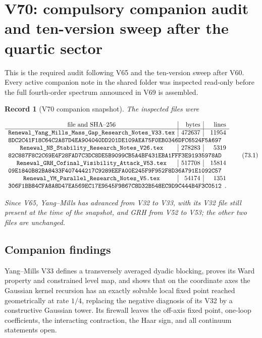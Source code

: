 \documentclass[11pt]{article}
\newtheorem{record}[theorem]{Record}
\theoremstyle{remark}
\begin{document}
\section{V70: compulsory companion audit and ten-version sweep after the quartic sector}
\label{sec:v19v70}

This is the required audit following V65 and the ten-version sweep
after V60.  Every active companion note in the shared folder was
inspected read-only before the full fourth-order spectrum announced in
V69 is assembled.

\begin{record}[V70 companion snapshot]
\label{rec:v19v70-snapshot}
The inspected files were

\[
\begin{array}{c|r|r}
\hbox{file and SHA--256}&\hbox{bytes}&\hbox{lines}\\ \hline
\texttt{Renewal\_Yang\_Mills\_Mass\_Gap\_Research\_Notes\_V33.tex}
&472637&11954\\
\multicolumn{3}{l}{
\texttt{8DC2C41F18C64C2A87D4EA904040DD201DE109AEA75F0EB0346DFC6524F5A697}}
\\
\texttt{Renewal\_NS\_Stability\_Research\_Notes\_V26.tex}
&278283&5319\\
\multicolumn{3}{l}{
\texttt{82C887F8C2C69E4F28FAD7C3DC8DE5B9099CB5A4BF431EBA1FFF3E91935978AD}}
\\
\texttt{Renewal\_GRH\_Cofinal\_Visibility\_Attack\_V53.tex}
&517708&15814\\
\multicolumn{3}{l}{
\texttt{09E1840B82BA8433F407444217C9289EEFA00E245F9F952F8D36A791E1092C57}}
\\
\texttt{Renewal\_YM\_Parallel\_Research\_Notes\_V5.tex}
&54174&1351\\
\multicolumn{3}{l}{
\texttt{306F1BB84CFA8A8D47EA569EC17E9545F9867C8D32B548EC9D9C444B4F3C0512}}.
\end{array}                                                     \tag{73.1}
\]

Since V65, Yang--Mills has advanced from V32 to V33, with its V32 file
still present at the time of the snapshot, and GRH from V52 to V53;
the other two files are unchanged.
\end{record}

\subsection{Companion findings}

Yang--Mills V33 defines a transversely averaged dyadic blocking, proves
its Ward property and constrained level map, and shows that on the
coordinate axes the Gaussian kernel recursion has an exactly solvable
local fixed point reached geometrically at rate \(1/4\), replacing the
negative diagnosis of its V32 by a constructive Gaussian tower.  Its
firewall leaves the off-axis fixed point, one-loop coefficients, the
interacting contraction, the Haar sign, and all continuum statements
open.
\end{document}
